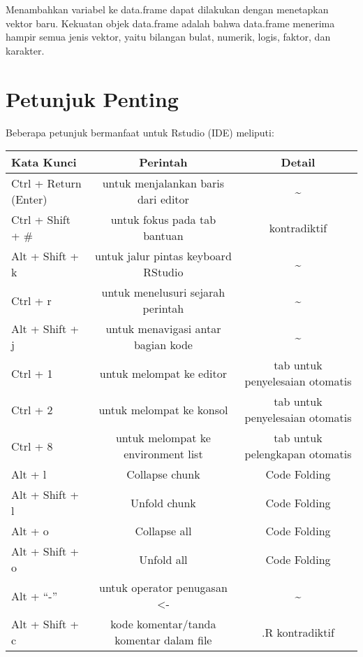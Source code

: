 \documentclass[
]{book}
\newenvironment{Shaded}{\begin{snugshade}}{\end{snugshade}}
\newcommand{\DataTypeTok}[1]{\textcolor[rgb]{0.13,0.29,0.53}{#1}}
\newcommand{\DecValTok}[1]{\textcolor[rgb]{0.00,0.00,0.81}{#1}}
\newcommand{\KeywordTok}[1]{\textcolor[rgb]{0.13,0.29,0.53}{\textbf{#1}}}
\newcommand{\NormalTok}[1]{#1}
\newcommand{\OperatorTok}[1]{\textcolor[rgb]{0.81,0.36,0.00}{\textbf{#1}}}
\newcommand{\StringTok}[1]{\textcolor[rgb]{0.31,0.60,0.02}{#1}}
\begin{document}
Menambahkan variabel ke data.frame dapat dilakukan dengan menetapkan vektor baru. Kekuatan objek data.frame adalah bahwa data.frame menerima hampir semua jenis vektor, yaitu bilangan bulat, numerik, logis, faktor, dan karakter.

\begin{Shaded}
\end{Shaded}

\hypertarget{petunjuk-penting}{%
\section{Petunjuk Penting}\label{petunjuk-penting}}

Beberapa petunjuk bermanfaat untuk Rstudio (IDE) meliputi:

\begin{longtable}[]{@{}lcc@{}}
\toprule
Kata Kunci & Perintah & Detail\tabularnewline
\midrule
\endhead
Ctrl + Return (Enter) & untuk menjalankan baris dari editor & \textasciitilde{}\tabularnewline
Ctrl + Shift + \# & untuk fokus pada tab bantuan & kontradiktif\tabularnewline
Alt + Shift + k & untuk jalur pintas keyboard RStudio & \textasciitilde{}\tabularnewline
Ctrl + r & untuk menelusuri sejarah perintah & \textasciitilde{}\tabularnewline
Alt + Shift + j & untuk menavigasi antar bagian kode & \textasciitilde{}\tabularnewline
Ctrl + 1 & untuk melompat ke editor & tab untuk penyelesaian otomatis\tabularnewline
Ctrl + 2 & untuk melompat ke konsol & tab untuk penyelesaian otomatis\tabularnewline
Ctrl + 8 & untuk melompat ke environment list & tab untuk pelengkapan otomatis\tabularnewline
Alt + l & Collapse chunk & Code Folding\tabularnewline
Alt + Shift + l & Unfold chunk & Code Folding\tabularnewline
Alt + o & Collapse all & Code Folding\tabularnewline
Alt + Shift + o & Unfold all & Code Folding\tabularnewline
Alt + ``-'' & untuk operator penugasan \textless- & \textasciitilde{}\tabularnewline
Alt + Shift + c & kode komentar/tanda komentar dalam file & .R kontradiktif\tabularnewline
\bottomrule
\end{longtable}
\end{document}
